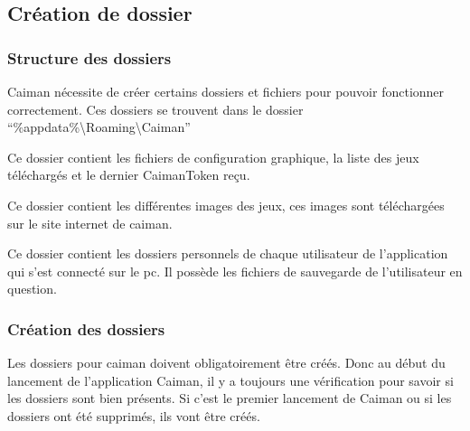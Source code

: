\documentclass[a4paper,12pt,french]{sphinxmanual}
\begin{document}
\subsection{Création de dossier}
\label{\detokenize{organique:creation-de-dossier}}

\subsubsection{Structure des dossiers}
\label{\detokenize{organique:structure-des-dossiers}}
\sphinxAtStartPar
Caiman nécessite de créer certains dossiers et fichiers pour pouvoir fonctionner correctement. Ces dossiers se trouvent dans le dossier “\%appdata\%\textbackslash{}Roaming\textbackslash{}Caiman”

\sphinxAtStartPar
{}

\sphinxAtStartPar
{}

\sphinxAtStartPar
Ce dossier contient les fichiers de configuration graphique, la liste des jeux téléchargés et le dernier CaimanToken reçu.

\sphinxAtStartPar
{}

\sphinxAtStartPar
Ce dossier contient les différentes images des jeux, ces images sont téléchargées sur le site internet de caiman.

\sphinxAtStartPar
{}

\sphinxAtStartPar
Ce dossier contient les dossiers personnels de chaque utilisateur de l’application qui s’est connecté sur le pc. Il possède les fichiers de sauvegarde de l’utilisateur en question.


\subsubsection{Création des dossiers}
\label{\detokenize{organique:creation-des-dossiers}}
\sphinxAtStartPar
{}

\sphinxAtStartPar
Les dossiers pour caiman doivent obligatoirement être créés. Donc au début du lancement de l’application Caiman, il y a toujours une vérification pour savoir si les dossiers sont bien présents. Si c’est le premier lancement de Caiman ou si les dossiers ont été supprimés, ils vont être créés.
\end{document}

